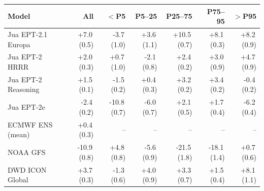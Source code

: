 \begin{tabular}{@{}lrrrrrr@{}}
\toprule
Model & All & $<$P5 & P5--25 & P25--75 & P75--95 & $>$P95 \\
\midrule
Jua EPT-2.1 Europa & +7.0\,(0.5) & -3.7\,(1.0) & +3.6\,(1.1) & +10.5\,(0.7) & +8.1\,(0.3) & +8.2\,(0.9) \\\addlinespace[0.35em]
Jua EPT-2 HRRR & +2.0\,(0.3) & +0.7\,(1.0) & -2.1\,(0.8) & +2.4\,(0.2) & +3.0\,(0.9) & +4.7\,(0.9) \\\addlinespace[0.35em]
Jua EPT-2 Reasoning & +1.5\,(0.1) & -1.5\,(0.2) & +0.4\,(0.3) & +3.2\,(0.2) & +3.4\,(0.2) & -0.4\,(0.2) \\\addlinespace[0.35em]
Jua EPT-2e & -2.4\,(0.2) & -10.8\,(0.7) & -6.0\,(0.7) & +2.1\,(0.5) & +1.7\,(0.4) & -6.2\,(0.4) \\\addlinespace[0.35em]
ECMWF ENS (mean) & +0.4\,(0.3) & -- & -- & -- & -- & -- \\\addlinespace[0.35em]
NOAA GFS & -10.9\,(0.8) & +4.8\,(0.8) & -5.6\,(0.9) & -21.5\,(1.8) & -18.1\,(1.4) & +0.7\,(0.6) \\\addlinespace[0.35em]
DWD ICON Global & +3.7\,(0.3) & -1.3\,(0.6) & +4.0\,(0.9) & +3.3\,(0.7) & +1.5\,(0.4) & +8.1\,(1.1) \\
\bottomrule
\end{tabular}
